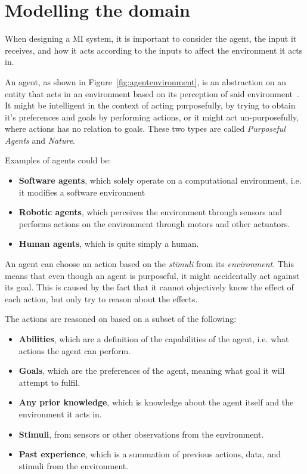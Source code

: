 \section{Modelling the domain}\label{Theory:MIModelling}
When designing a MI system, it is important to consider the agent, the input it receives, and how it acts according to the inputs to affect the environment it acts in.



An agent, as shown in Figure~\ref{fig:agentenvironment}, is an abstraction on an entity that acts in an environment based on its perception of said environment~\cite{ArtificialIntelligencealanpoole}.
It might be intelligent in the context of acting purposefully, by trying to obtain it's preferences and goals by performing actions, or it might act un-purposefully, where actions has no relation to goals.
These two types are called \textit{Purposeful Agents} and \textit{Nature}.

Examples of agents could be:
\begin{itemize}
	\item \textbf{Software agents}, which solely operate on a computational environment, i{.}e{.} it modifies a software environment
	\item \textbf{Robotic agents}, which perceives the environment through sensors and performs actions on the environment through motors and other actuators.
	\item \textbf{Human agents}, which is quite simply a human. 
\end{itemize}

An agent can choose an action based on the \textit{stimuli} from its \textit{environment}.
This means that even though an agent is purposeful, it might accidentally act against its goal.
This is caused by the fact that it cannot objectively know the effect of each action, but only try to reason about the effects.


The actions are reasoned on based on a subset of the following:
\begin{itemize}
    \item \textbf{Abilities}, which are a definition of the capabilities of the agent, i{.}e{.} what actions the agent can perform.
    \item \textbf{Goals}, which are the preferences of the agent, meaning what goal it will attempt to fulfil.
    \item \textbf{Any prior knowledge}, which is knowledge about the agent itself and the environment it acts in.
    \item \textbf{Stimuli}, from sensors or other observations from the environment.
    \item \textbf{Past experience}, which is a summation of previous actions, data, and stimuli from the environment.
\end{itemize}

